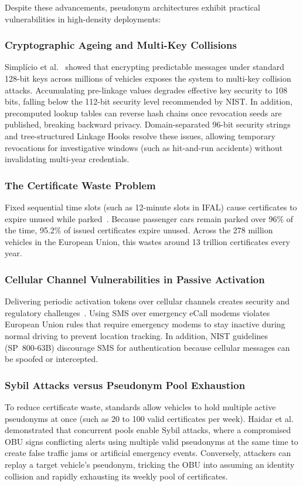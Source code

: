 Despite these advancements, pseudonym architectures exhibit practical vulnerabilities in high-density deployments:

\subsubsection{Cryptographic Ageing and Multi-Key Collisions}
Simpl\'icio et al.~\cite{simplicio2018privacy} showed that encrypting predictable messages under standard 128-bit keys across millions of vehicles exposes the system to multi-key collision attacks.
Accumulating pre-linkage values degrades effective key security to 108 bits, falling below the 112-bit security level recommended by NIST.
In addition, precomputed lookup tables can reverse hash chains once revocation seeds are published, breaking backward privacy.
Domain-separated 96-bit security strings and tree-structured Linkage Hooks resolve these issues, allowing temporary revocations for investigative windows (such as hit-and-run accidents) without invalidating multi-year credentials.

\subsubsection{The Certificate Waste Problem}
Fixed sequential time slots (such as 12-minute slots in IFAL) cause certificates to expire unused while parked~\cite{yoshizawa2023new}.
Because passenger cars remain parked over 96\% of the time, 95.2\% of issued certificates expire unused.
Across the 278 million vehicles in the European Union, this wastes around 13 trillion certificates every year.

\subsubsection{Cellular Channel Vulnerabilities in Passive Activation}
Delivering periodic activation tokens over cellular channels creates security and regulatory challenges~\cite{yoshizawa2023new}.
Using SMS over emergency eCall modems violates European Union rules that require emergency modems to stay inactive during normal driving to prevent location tracking.
In addition, NIST guidelines (SP~800-63B) discourage SMS for authentication because cellular messages can be spoofed or intercepted.

\subsubsection{Sybil Attacks versus Pseudonym Pool Exhaustion}
To reduce certificate waste, standards allow vehicles to hold multiple active pseudonyms at once (such as 20 to 100 valid certificates per week).
Haidar et al.~\cite{haidar2019risk} demonstrated that concurrent pools enable Sybil attacks, where a compromised OBU signs conflicting alerts using multiple valid pseudonyms at the same time to create false traffic jams or artificial emergency events.
Conversely, attackers can replay a target vehicle's pseudonym, tricking the OBU into assuming an identity collision and rapidly exhausting its weekly pool of certificates.

